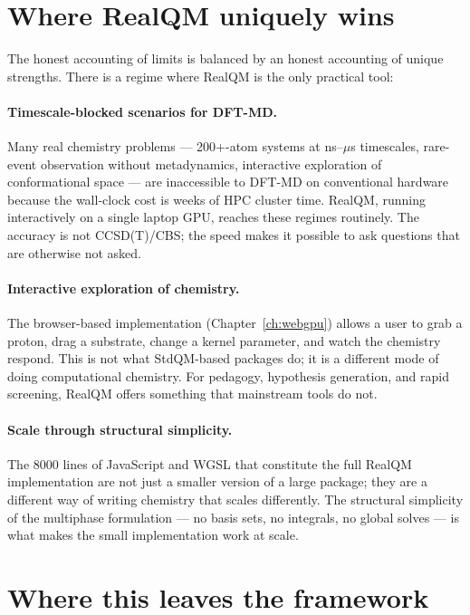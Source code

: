 \section{Where RealQM uniquely wins}\label{sec:where-wins}

The honest accounting of limits is balanced by an honest accounting of unique strengths. There is a regime where RealQM is the only practical tool:

\paragraph{Timescale-blocked scenarios for DFT-MD.}
Many real chemistry problems --- 200+-atom systems at ns--$\mu$s timescales, rare-event observation without metadynamics, interactive exploration of conformational space --- are inaccessible to DFT-MD on conventional hardware because the wall-clock cost is weeks of HPC cluster time. RealQM, running interactively on a single laptop GPU, reaches these regimes routinely. The accuracy is not CCSD(T)/CBS; the speed makes it possible to ask questions that are otherwise not asked.

\paragraph{Interactive exploration of chemistry.}
The browser-based implementation (Chapter~\ref{ch:webgpu}) allows a user to grab a proton, drag a substrate, change a kernel parameter, and watch the chemistry respond. This is not what StdQM-based packages do; it is a different mode of doing computational chemistry. For pedagogy, hypothesis generation, and rapid screening, RealQM offers something that mainstream tools do not.

\paragraph{Scale through structural simplicity.}
The 8000 lines of JavaScript and WGSL that constitute the full RealQM implementation are not just a smaller version of a large package; they are a different way of writing chemistry that scales differently. The structural simplicity of the multiphase formulation --- no basis sets, no integrals, no global solves --- is what makes the small implementation work at scale.

\section{Where this leaves the framework}\label{sec:limits-summary}

